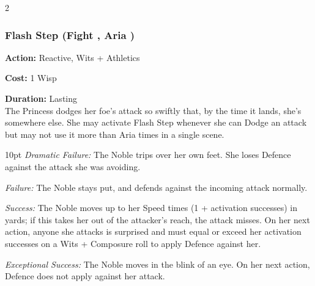 \begin{multicols}{2}





\subsubsection*{Flash Step (Fight \textbullet\textbullet\textbullet, Aria \textbullet\textbullet\textbullet)}

\noindent \textbf{Action:} Reactive, Wits + Athletics

\noindent \textbf{Cost:} 1 Wisp

\noindent \textbf{Duration:} Lasting\\

\noindent The Princess dodges her foe's attack so swiftly that, by the time it lands, she's somewhere else. She may activate Flash Step whenever she can Dodge an attack but may not use it more than Aria times in a single scene. 

\begin{myindentpar}{10pt} 
\emph{Dramatic Failure:}  The Noble trips over her own feet. She loses Defence against the attack she was avoiding.

\emph{Failure:} The Noble stays put, and defends against the incoming attack normally.

\emph{Success:}  The Noble moves up to her Speed times (1 + activation successes) in yards; if this takes her out of the attacker’s reach, the attack misses. On her next action, anyone she attacks is surprised and must equal or exceed her activation successes on a Wits + Composure roll to apply Defence against her.

\emph{Exceptional Success:} The Noble moves in the blink of an eye. On her next action, Defence does not apply against her attack.\end{myindentpar}



\end{multicols}

